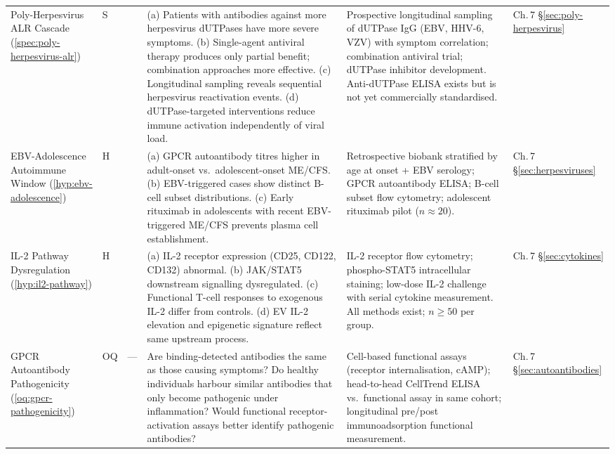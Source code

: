 \begin{longtable}{%
  p{3.0cm}
  >{\centering\arraybackslash}p{0.55cm}
  >{\centering\arraybackslash}p{1.0cm}
  p{3.8cm}
  p{3.8cm}
  p{2.2cm}
}
Poly-Herpesvirus ALR Cascade
(\ref{spec:poly-herpesvirus-alr})
&
S & 0.35
&
(a) Patients with antibodies against more herpesvirus dUTPases have more severe
symptoms.
(b) Single-agent antiviral therapy produces only partial benefit; combination
approaches more effective.
(c) Longitudinal sampling reveals sequential herpesvirus reactivation events.
(d) dUTPase-targeted interventions reduce immune activation independently of
viral load.
&
Prospective longitudinal sampling of dUTPase IgG (EBV, HHV-6, VZV) with
symptom correlation; combination antiviral trial; dUTPase inhibitor
development.  Anti-dUTPase ELISA exists but is not yet commercially
standardised.
&
Ch.\,7 \S\ref{sec:poly-herpesvirus} \\[6pt]

EBV-Adolescence Autoimmune Window
(\ref{hyp:ebv-adolescence})
&
H & 0.50
&
(a) GPCR autoantibody titres higher in adult-onset vs.\ adolescent-onset ME/CFS.
(b) EBV-triggered cases show distinct B-cell subset distributions.
(c) Early rituximab in adolescents with recent EBV-triggered ME/CFS prevents
plasma cell establishment.
&
Retrospective biobank stratified by age at onset + EBV serology;
GPCR autoantibody ELISA; B-cell subset flow cytometry;
adolescent rituximab pilot ($n \approx 20$).
&
Ch.\,7 \S\ref{sec:herpesviruses} \\[6pt]

IL-2 Pathway Dysregulation
(\ref{hyp:il2-pathway})
&
H & 0.45
&
(a) IL-2 receptor expression (CD25, CD122, CD132) abnormal.
(b) JAK/STAT5 downstream signalling dysregulated.
(c) Functional T-cell responses to exogenous IL-2 differ from controls.
(d) EV IL-2 elevation and epigenetic signature reflect same upstream process.
&
IL-2 receptor flow cytometry; phospho-STAT5 intracellular staining;
low-dose IL-2 challenge with serial cytokine measurement.
All methods exist; $n \geq 50$ per group.
&
Ch.\,7 \S\ref{sec:cytokines} \\[6pt]

GPCR Autoantibody Pathogenicity
(\ref{oq:gpcr-pathogenicity})
&
OQ & ---
&
Are binding-detected antibodies the same as those causing symptoms?
Do healthy individuals harbour similar antibodies that only become pathogenic
under inflammation?
Would functional receptor-activation assays better identify pathogenic antibodies?
&
Cell-based functional assays (receptor internalisation, cAMP);
head-to-head CellTrend ELISA vs.\ functional assay in same cohort;
longitudinal pre/post immunoadsorption functional measurement.
&
Ch.\,7 \S\ref{sec:autoantibodies} \\[6pt]


\end{longtable}
